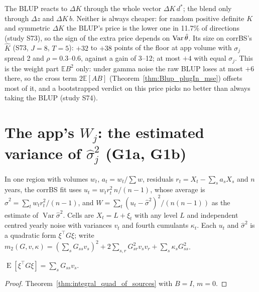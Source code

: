\begin{remark}
  The BLUP reacts to $\Delta K$ through the whole vector $\Delta K\,d^*$; the blend only through
  $\Delta z$ and $\Delta K\,b$. Neither is always cheaper: for random positive definite $K$ and
  symmetric $\Delta K$ the BLUP's price is the lower one in 11.7\% of directions (study S73), so the
  sign of the extra price depends on $\operatorname{Var}\hat\theta$. Its size on corrBS's $\hat K$ (S73, $J = 8$,
  $T = 5$): $+32$ to $+38$ points of the floor at app volume with $\sigma_j$ spread 2 and
  $\rho = 0.3$--$0.6$, against a gain of 3--12; at most $+4$ with equal $\sigma_j$. This is the
  weight part $\mathbb E B^2$ only: under gamma noise the raw BLUP loses at most $+6$ there, so the
  cross term $2\mathbb E[AB]$ (Theorem~\ref{thm:Blup_plugIn_mse}) offsets most of it, and a
  bootstrapped verdict on this price picks no better than always taking the BLUP (study S74).
\end{remark}

\section{The app's \texorpdfstring{$W_j$}{Wj}: the estimated variance of \texorpdfstring{$\hat\sigma_j^2$}{sigma-hat squared} (G1a, G1b)}

In one region with volumes $w_t$, $a_t = w_t/\sum w$, residuals $r_t = X_t - \sum_s a_sX_s$ and $n$
years, the corrBS fit uses $u_t = w_tr_t^2\,n/(n-1)$, whose average is
$\hat\sigma^2 = \sum_t w_tr_t^2/(n-1)$, and $W = \sum_t(u_t - \hat\sigma^2)^2/(n(n-1))$ as the
estimate of $\operatorname{Var}\hat\sigma^2$. Cells are $X_t = L + \xi_t$ with any level $L$ and
independent centred yearly noise with variances $v_t$ and fourth cumulants $\kappa_t$. Each $u_t$ and
$\hat\sigma^2$ is a quadratic form $\xi^\top G\xi$; write
$m_2(G, v, \kappa) = (\sum_s G_{ss}v_s)^2 + 2\sum_{s,r}G_{sr}^2v_sv_r + \sum_s\kappa_sG_{ss}^2$.

\begin{theorem}\label{thm:integral_quadForm_of_sources}
  \leanok
  $\operatorname{E}[\xi^\top G\xi] = \sum_s G_{ss}v_s$.
\end{theorem}
\begin{proof}
  \leanok
  Theorem~\ref{thm:integral_quad_of_sources} with $B = I$, $m = 0$.
\end{proof}

